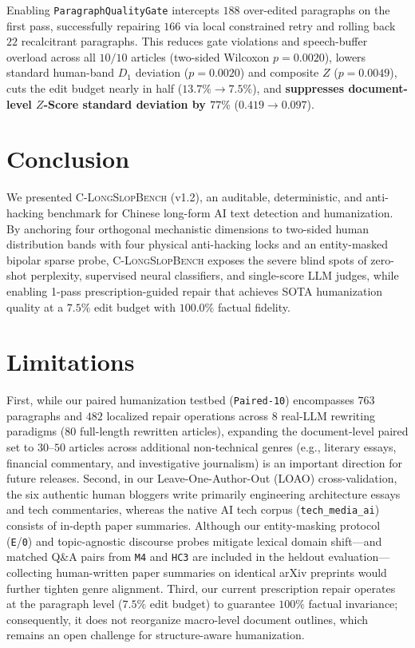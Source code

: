 \documentclass[11pt]{article}
\newcommand{\bench}{\textsc{C-LongSlopBench}}
\newcommand{\gate}{\texttt{ParagraphQualityGate}}
\begin{document}
Enabling \gate{} intercepts $188$ over-edited paragraphs on the first pass, successfully repairing $166$ via local constrained retry and rolling back $22$ recalcitrant paragraphs. This reduces gate violations and speech-buffer overload across all $10/10$ articles (two-sided Wilcoxon $p = 0.0020$), lowers standard human-band $D_1$ deviation ($p = 0.0020$) and composite $Z$ ($p = 0.0049$), cuts the edit budget nearly in half ($13.7\% \to 7.5\%$), and \textbf{suppresses document-level $Z$-Score standard deviation by $77\%$} ($0.419 \to 0.097$).

\section{Conclusion}
We presented \bench{} (v1.2), an auditable, deterministic, and anti-hacking benchmark for Chinese long-form AI text detection and humanization. By anchoring four orthogonal mechanistic dimensions to two-sided human distribution bands with four physical anti-hacking locks and an entity-masked bipolar sparse probe, \bench{} exposes the severe blind spots of zero-shot perplexity, supervised neural classifiers, and single-score LLM judges, while enabling 1-pass prescription-guided repair that achieves SOTA humanization quality at a $7.5\%$ edit budget with $100.0\%$ factual fidelity.

\section*{Limitations}
First, while our paired humanization testbed (\texttt{Paired-10}) encompasses $763$ paragraphs and $482$ localized repair operations across $8$ real-LLM rewriting paradigms ($80$ full-length rewritten articles), expanding the document-level paired set to $30$--$50$ articles across additional non-technical genres (e.g., literary essays, financial commentary, and investigative journalism) is an important direction for future releases. Second, in our Leave-One-Author-Out (LOAO) cross-validation, the six authentic human bloggers write primarily engineering architecture essays and tech commentaries, whereas the native AI tech corpus (\texttt{tech\_media\_ai}) consists of in-depth paper summaries. Although our entity-masking protocol (\texttt{E}/\texttt{0}) and topic-agnostic discourse probes mitigate lexical domain shift---and matched Q\&A pairs from \texttt{M4} and \texttt{HC3} are included in the heldout evaluation---collecting human-written paper summaries on identical arXiv preprints would further tighten genre alignment. Third, our current prescription repair operates at the paragraph level ($7.5\%$ edit budget) to guarantee $100\%$ factual invariance; consequently, it does not reorganize macro-level document outlines, which remains an open challenge for structure-aware humanization.
\end{document}
